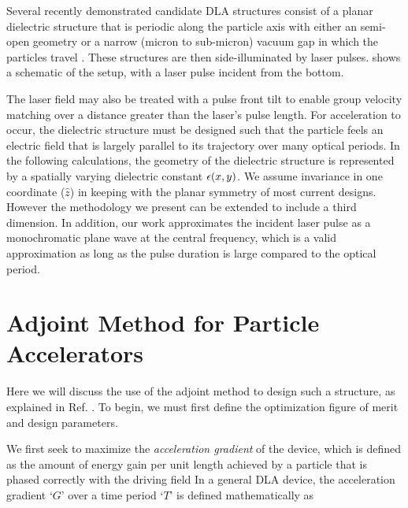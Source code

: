 Several recently demonstrated candidate DLA structures consist of a planar dielectric structure that is periodic along the particle axis with either an semi-open geometry or a narrow (micron to sub-micron) vacuum gap in which the particles travel \cite{plettner2006proposed, peralta2013demonstration, mcneur2016elements, leedle2015dielectric, chang2014silicon, breuer2014dielectric, breuer2014dielectric2, kozak2016dielectric}.
These structures are then side-illuminated by laser pulses.
 shows a schematic of the setup, with a laser pulse incident from the bottom.


The laser field may also be treated with a pulse front tilt \cite{hebling1996derivation, akturk2004pulse} to enable group velocity matching over a distance greater than the laser's pulse length.
For acceleration to occur, the dielectric structure must be designed such that the particle feels an electric field that is largely parallel to its trajectory over many optical periods.
In the following calculations, the geometry of the dielectric structure is represented by a spatially varying dielectric constant $\epsilon(x,y)$.
We assume invariance in one coordinate ($\hat{z}$) in keeping with the planar symmetry of most current designs.
However the methodology we present can be extended to include a third dimension.
In addition, our work approximates the incident laser pulse as a monochromatic plane wave at the central frequency, which is a valid approximation as long as the pulse duration is large compared to the optical period.

\section{Adjoint Method for Particle Accelerators}

Here we will discuss the use of the adjoint method to design such a structure, as explained in Ref. .
To begin, we must first define the optimization figure of merit and design parameters.

We first seek to maximize the \textit{acceleration gradient} of the device, which is defined as the amount of energy gain per unit length achieved by a particle that is phased correctly with the driving field
In a general DLA device, the acceleration gradient `$G$' over a time period `$T$' is defined mathematically as

